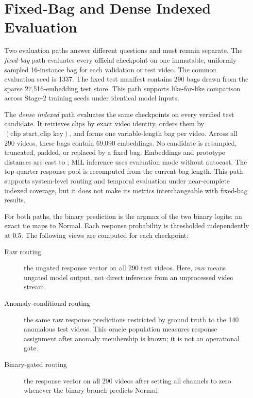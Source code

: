 \section{Fixed-Bag and Dense Indexed Evaluation}
\label{sec:evaluation-paths}

Two evaluation paths answer different questions and must remain separate. The \emph{fixed-bag} path evaluates every official checkpoint on one immutable, uniformly sampled 16-instance bag for each validation or test video. The common evaluation seed is 1337. The fixed test manifest contains 290 bags drawn from the sparse 27,516-embedding test store. This path supports like-for-like comparison across Stage-2 training seeds under identical model inputs.

The \emph{dense indexed} path evaluates the same checkpoints on every verified test candidate. It retrieves clips by exact video identity, orders them by $(\text{clip start},\text{clip key})$, and forms one variable-length bag per video. Across all 290 videos, these bags contain 69,090 embeddings. No candidate is resampled, truncated, padded, or replaced by a fixed bag. Embeddings and prototype distances are cast to ; MIL inference uses evaluation mode without autocast. The top-quarter response pool is recomputed from the current bag length. This path supports system-level routing and temporal evaluation under near-complete indexed coverage, but it does not make its metrics interchangeable with fixed-bag results.

For both paths, the binary prediction is the argmax of the two binary logits; an exact tie maps to Normal. Each response probability is thresholded independently at 0.5. The following views are computed for each checkpoint:

\begin{description}
    \item[Raw routing] the ungated response vector on all 290 test videos. Here, \emph{raw} means ungated model output, not direct inference from an unprocessed video stream.
    \item[Anomaly-conditional routing] the same raw response predictions restricted by ground truth to the 140 anomalous test videos. This oracle population measures response assignment after anomaly membership is known; it is not an operational gate.
    \item[Binary-gated routing] the response vector on all 290 videos after setting all channels to zero whenever the binary branch predicts Normal.
\end{description}

